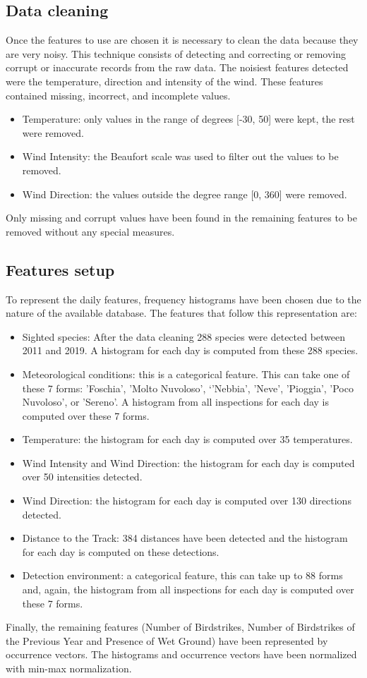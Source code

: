 \subsection{Data cleaning}
Once the features to use are chosen it is necessary to clean the data because they are very noisy. This technique consists of detecting and correcting or removing corrupt or inaccurate records from the raw data.
The noisiest features detected were the temperature, direction and intensity of the wind.
These features contained missing, incorrect, and incomplete values.
\begin{itemize}
    \item Temperature: only values in the range of degrees [-30, 50] were kept, the rest were removed.
    \item Wind Intensity: the Beaufort scale \cite{huler2007defining} was used to filter out the values to be removed.
    \item Wind Direction: the values outside the degree range [0, 360] were removed.
\end{itemize}
Only missing and corrupt values have been found in the remaining features to be removed without any special measures.

\subsection{Features setup}\label{feat_setup}
To represent the daily features, frequency histograms have been chosen due to the nature of the available database. The features that follow this representation are:

\begin{itemize}
    \item Sighted species: After the data cleaning 288 species were detected between 2011 and 2019. A histogram for each day is computed from these 288 species.
    \item Meteorological conditions: this is a categorical feature. This can take one of these 7 forms: 'Foschia', 'Molto Nuvoloso', ‘'Nebbia', 'Neve', 'Pioggia', 'Poco Nuvoloso', or 'Sereno'. A histogram from all inspections for each day is computed over these 7 forms.
    \item Temperature: the histogram for each day is computed over 35 temperatures.
    \item Wind Intensity and Wind Direction: the histogram for each day is computed over 50 intensities detected.
    \item Wind Direction: the histogram for each day is computed over 130 directions detected.
    \item Distance to the Track: 384 distances have been detected and the histogram for each day is computed on these detections.
    \item Detection environment: a categorical feature, this can take up to 88 forms and, again, the histogram from all inspections for each day is computed over these 7 forms.
\end{itemize}
Finally, the remaining features (Number of Birdstrikes, Number of Birdstrikes of the Previous Year and Presence of Wet Ground) have been represented by occurrence vectors.
The histograms and occurrence vectors have been normalized with min-max normalization.

